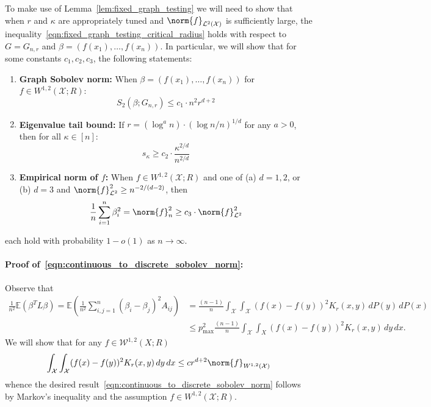 \documentclass{article}
\newcommand{\1}{\mathbf{1}}
\newcommand{\X}{X} %
\newcommand{\Xset}{\mathcal{X}}
\newcommand{\Leb}{\mathcal{L}}
\newcommand{\Ebb}{\mathbb{E}}
\theoremstyle{alden}
\theoremstyle{aldenthm}
\theoremstyle{definition}
\theoremstyle{remark}
\begin{document}
To make use of Lemma~\ref{lem:fixed_graph_testing} we will need to show that when $r$ and $\kappa$ are appropriately tuned and $\norm{f}_{\Leb^2(\mathcal{X})}$ is sufficiently large, the inequality~\eqref{eqn:fixed_graph_testing_critical_radius} holds with respect to $G = G_{n,r}$ and $\beta = (f(x_1),\ldots,f(x_n))$. In particular, we will show that for some constants $c_1,c_2,c_3$, the following statements:
\begin{enumerate}[label=(E\arabic*)]
	\item 
	\label{event:discrete_sobolev_norm}
	\textbf{Graph Sobolev norm:} When $\beta = (f(x_1),\ldots,f(x_n))$ for $f \in W^{1,2}(\mathcal{X};R)$:
	\begin{equation}
	\label{eqn:continuous_to_discrete_sobolev_norm}
	S_2(\beta;G_{n,r}) \leq c_1 \cdot n^2 r^{d + 2} 
	\end{equation}
	\item 
	\label{event:eigenvalue_tail_decay}
	\textbf{Eigenvalue tail bound:} If $r = (\log^{a}n)\cdot(\log n/n)^{1/d}$ for any $a > 0$, then for all $\kappa \in [n]$:
	\begin{equation}
	\label{eqn:eigenvalue_tail_bound}
	s_{\kappa} \geq c_2 \cdot \frac{\kappa^{2/d}}{n^{2/d}}
	\end{equation}
	\item 
	\label{event:l2_norm}
	\textbf{Empirical norm of $f$:} When $f \in W^{1,2}(\mathcal{X};R)$ and one of (a) $d = 1,2$, or (b) $d = 3$ and $\norm{f}_{\Leb^2}^2 \geq n^{-2/(d - 2)}$, then
	\begin{equation}
	\label{eqn:l2_to_empirical_norm}
	\frac{1}{n}\sum_{i = 1}^{n}\beta_i^2 = \norm{f}_n^2 \geq c_3 \cdot \norm{f}_{\Leb^2}^2
	\end{equation}
\end{enumerate} 

each hold with probability $1 - o(1)$ as $n \to \infty$.

\paragraph{Proof of~\eqref{eqn:continuous_to_discrete_sobolev_norm}:}

Observe that
\begin{align*}
\frac{1}{n^2}\Ebb(\beta^T L \beta) = \Ebb\left(\frac{1}{n^2} \sum_{i,j = 1}^{n} (\beta_i - \beta_j)^2 A_{ij}\right) & = \frac{(n - 1)}{n} \int_{\Xset} \int_{\Xset} (f(x) - f(y))^2K_r(x,y) \,dP(y) \,dP(x) \\
& \leq p_{\max}^2 \frac{(n - 1)}{n} \int_{\Xset} \int_{\X} (f(x) - f(y))^2K_r(x,y) \,dy \,dx.
\end{align*}
We will show that for any $f \in \mathcal{W}^{1,2}(\X;R)$
\begin{equation}
\label{eqn:nonlocal_continuous_sobolev_norm}
\int_{\Xset} \int_{\Xset} (f(x) - f(y))^2K_r(x,y) \,dy \,dx \leq c r^{d + 2} \norm{f}_{W^{1,2}(\mathcal{X})}
\end{equation}
whence the desired result~\eqref{eqn:continuous_to_discrete_sobolev_norm} follows by Markov's inequality and the assumption $f \in W^{1,2}(\mathcal{X};R)$.
\end{document}

